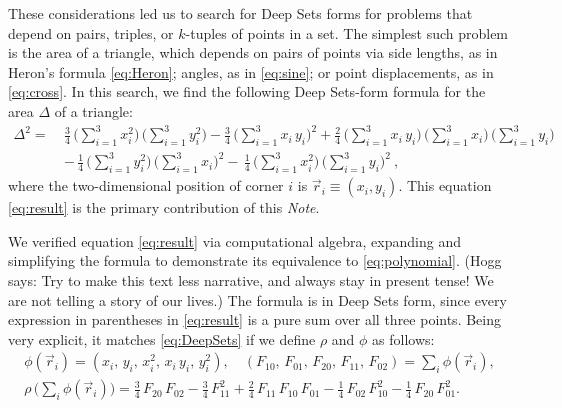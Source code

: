 \documentclass[12pt]{article}
\newcommand{\documentname}{\textsl{Note}}
\newcommand{\Hogg}[1]{{\color{violet} (Hogg says: #1)}}
\newcommand{\pseudosection}[1]
{}
\begin{document}
\pseudosection{Result}

These considerations led us to search for Deep Sets forms for problems that depend on pairs, triples, or $k$-tuples of points in a set. 
The simplest such problem is the area of a triangle, which depends on pairs of points via
side lengths, as in Heron's formula \eqref{eq:Heron};
angles, as in \eqref{eq:sine};
or point displacements, as in \eqref{eq:cross}.
In this search, we find the following Deep Sets-form formula for the area $\Delta$ of a triangle:
\begin{align}
    \Delta^2 = \ &
    \frac{3}{4} \, \big( \sum_{i=1}^{3} x_i^2 \big) \, \big( \sum_{i=1}^{3} y_i^2 \big)
    - \frac{3}{4} \, \big( \sum_{i=1}^{3} x_i \, y_i \big)^2 
    + \frac{2}{4} \, \big( \sum_{i=1}^{3} x_i \, y_i \big) \, \big( \sum_{i=1}^{3} x_i \big) \, \big( \sum_{i=1}^{3} y_i \big)
    \nonumber\\ &
    - \, \frac{1}{4} \, \big( \sum_{i=1}^{3} y_i^2 \big) \, \big( \sum_{i=1}^{3} x_i \big)^2
    - \, \frac{1}{4} \, \big( \sum_{i=1}^{3} x_i^2 \big) \, \big( \sum_{i=1}^{3} y_i \big)^2
     ~,
\label{eq:result}
\end{align}
where the two-dimensional position of corner $i$ is $\vec{r}_i \equiv (x_i, y_i)$.
This equation \eqref{eq:result} is the primary contribution of this \documentname.

We verified equation \eqref{eq:result} via computational algebra, expanding and simplifying the formula to demonstrate its equivalence to \eqref{eq:polynomial}.
\Hogg{Try to make this text less narrative, and always stay in present tense! We are not telling a story of our lives.}
The formula is in Deep Sets form, since
every expression in parentheses in \eqref{eq:result} is a pure sum over all three points.
Being very explicit, it matches \eqref{eq:DeepSets} if we define $\rho$ and $\phi$ as follows:
\begin{gather}
    \phi(\vec{r}_i) = (
        x_i, \,
        y_i, \,
        x_i^2, \,
        x_i \, y_i, \,
        y_i^2
    ), \quad
    (
        F_{10}, \,
        F_{01}, \,
        F_{20}, \,
        F_{11}, \,
        F_{02}
    ) = \sum_i \phi(\vec{r}_i),
    \nonumber\\
    \rho \, \big( \sum_i \phi(\vec{r}_i) \big)
    = \tfrac{3}{4} \, F_{20} \, F_{02}
    - \tfrac{3}{4} \, F_{11}^2
    + \tfrac{2}{4} \, F_{11} \, F_{10} \, F_{01}
    - \tfrac{1}{4} \, F_{02} \, F_{10}^2
    - \tfrac{1}{4} \, F_{20} \, F_{01}^2.
\end{gather}
\end{document}
